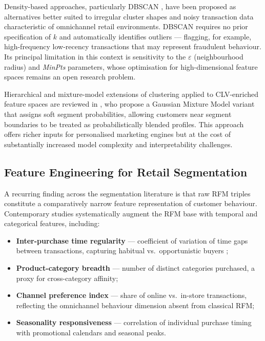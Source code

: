 Density-based approaches, particularly DBSCAN \cite{ester1996density}, have been proposed as alternatives better suited to irregular cluster shapes and noisy transaction data characteristic of omnichannel retail environments. DBSCAN requires no prior specification of $k$ and automatically identifies outliers — flagging, for example, high-frequency low-recency transactions that may represent fraudulent behaviour. Its principal limitation in this context is sensitivity to the $\varepsilon$ (neighbourhood radius) and \textit{MinPts} parameters, whose optimisation for high-dimensional feature spaces remains an open research problem.

Hierarchical and mixture-model extensions of clustering applied to CLV-enriched feature spaces are reviewed in \cite{AITU2022}, who propose a Gaussian Mixture Model variant that assigns soft segment probabilities, allowing customers near segment boundaries to be treated as probabilistically blended profiles. This approach offers richer inputs for personalised marketing engines but at the cost of substantially increased model complexity and interpretability challenges.

\subsection{Feature Engineering for Retail Segmentation}

A recurring finding across the segmentation literature is that raw RFM triples constitute a comparatively narrow feature representation of customer behaviour. Contemporary studies systematically augment the RFM base with temporal and categorical features, including:

\begin{itemize}[noitemsep]
    \item \textbf{Inter-purchase time regularity} — coefficient of variation of time gaps between transactions, capturing habitual vs.\ opportunistic buyers \cite{preprints2026};
    \item \textbf{Product-category breadth} — number of distinct categories purchased, a proxy for cross-category affinity;
    \item \textbf{Channel preference index} — share of online vs.\ in-store transactions, reflecting the omnichannel behaviour dimension absent from classical RFM;
    \item \textbf{Seasonality responsiveness} — correlation of individual purchase timing with promotional calendars and seasonal peaks.
\end{itemize}

